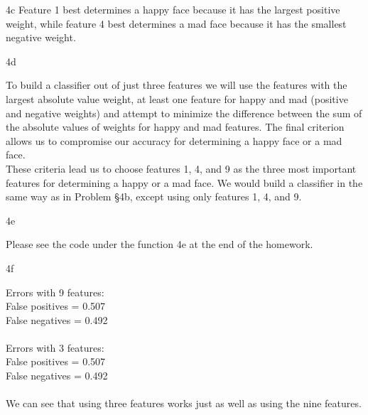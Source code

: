 \documentclass{article}
\begin{document}
\begin{homeworkProblem}
\begin{homeworkSection}{4c}
        Feature 1 best determines a happy face because it has the largest
        positive weight, while feature 4 best determines a mad face because it
        has the smallest negative weight. 

    \end{homeworkSection}

    \begin{homeworkSection}{4d}
        
        To build a classifier out of just three features we will use the
        features with the largest absolute value weight, at least one feature
        for happy and mad (positive and negative weights) and attempt to
        minimize the difference between the sum of the absolute values of
        weights for happy and mad features. The final criterion allows us to
        compromise our accuracy for determining a happy face or a mad face. \\

        These criteria lead us to choose features 1, 4, and 9 as the three most
        important features for determining a happy or a mad face. We would
        build a classifier in the same way as in Problem \S 4b, except using
        only features 1, 4, and 9.

    \end{homeworkSection}
    
    \begin{homeworkSection}{4e}
        
        Please see the code under the function 4e at the end of the homework.

    \end{homeworkSection}
    
    \begin{homeworkSection}{4f}

        Errors with 9 features: \\
            False positives = 0.507 \\
            False negatives = 0.492 \\ \\

        Errors with 3 features: \\
            False positives = 0.507 \\
            False negatives = 0.492 \\ \\

        We can see that using three features works just as well as using the
        nine features.

    \end{homeworkSection}

\end{homeworkProblem}

\begin{homeworkProblem}
\end{homeworkProblem}
\end{document}
